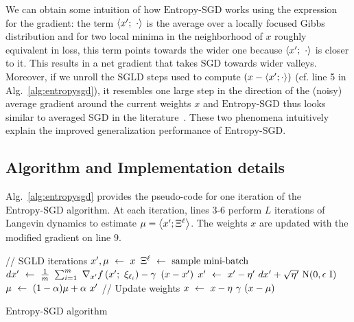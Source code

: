 \documentclass[10pt]{article}
\newcommand{\entropysgd}{\mathrm{Entropy}\textrm{-}\mathrm{SGD}}
\newcommand{\minibatch}[1]{\Xi^{#1}}
\begin{document}
We can obtain some intuition of how $\entropysgd$ works using the expression for the gradient: the term $\left\langle x';\ \cdot\right\rangle$ is the average over a locally focused Gibbs distribution and for two local minima in the neighborhood of $x$ roughly equivalent in loss, this term points towards the wider one because $\left\langle x';\ \cdot\right\rangle$ is closer to it. This results in a net gradient that takes SGD towards wider valleys. Moreover, if we unroll the SGLD steps used to compute $\left(x - \left\langle x'; \cdot\right\rangle\right)$ (cf. line 5 in Alg.~\ref{alg:entropysgd}), it resembles one large step in the direction of the (noisy) average gradient around the current weights $x$ and $\entropysgd$ thus looks similar to averaged SGD in the literature~\citep{polyak1992acceleration,bottou2012stochastic}. These two phenomena intuitively explain the improved generalization performance of $\entropysgd$.

\subsection{Algorithm and Implementation details}
\label{ss:alg}

Alg.~\ref{alg:entropysgd} provides the pseudo-code for one iteration of the $\entropysgd$ algorithm. At each iteration, lines $3$-$6$ perform $L$ iterations of Langevin dynamics to estimate $\mu = \ag{x'; \minibatch{\ell}}$. The weights $x$ are updated with the modified gradient on line $9$.

\begin{center}
\begin{minipage}{0.7 \textwidth}
\IncMargin{0.04in}
\begin{algorithm}[H]

    \small
    \vspace{0.1in}
    \nonl \textrm{// SGLD iterations}\;
    \vspace{0.025in}
    $x', \mu \ \leftarrow\  x$\;
    {
        $\minibatch{\ell} \la \textrm{sample mini-batch}$\;
        \vspace{0.03in}
        $dx' \ \leftarrow\  \frac{1}{m}\ \sum_{i=1}^m\ \nabla_{x'} f\left(x';\ \xi_{\ell_i}\right) - \gamma\ \left(x - x'\right)$\;
        \vspace{0.03in}
        $x' \ \leftarrow\  x' - \eta'\ dx' + \sqrt{\eta'}\ \mathrm{N}(0, \epsilon\ \mathrm{I})$\;
        \vspace{0.03in}
        $\mu \la (1-\a) \mu + \a\ x'$\;
    }
    \vspace{0.1in}
    \nonl \textrm{// Update weights}\;
    \vspace{0.03in}
    $x \ \leftarrow\  x - \eta\ \gamma\ (x-\mu)$
    \caption{$\entropysgd$ algorithm}
    \label{alg:entropysgd}
\end{algorithm}
\DecMargin{0.04in}
\end{minipage}
\end{center}
\end{document}
